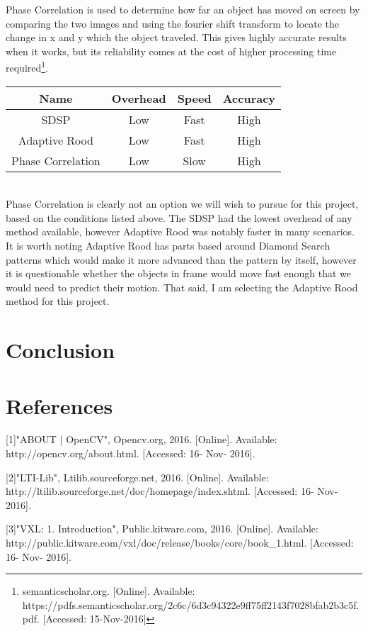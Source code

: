 \documentclass[letterpaper,10pt,onecolumn,draftclsnofoot]{IEEEtran}
\begin{document}
Phase Correlation is used to determine how far an object has moved on screen by comparing the two images and using the fourier shift transform to locate the change in x and y which the object traveled.  This gives highly accurate results when it works, but its reliability comes at the cost of higher processing time required\footnote{semanticscholar.org. [Online]. Available: https://pdfs.semanticscholar.org/2c6c/6d3c94322e9ff75ff2143f7028bfab2b3c5f.pdf. [Accessed: 15-Nov-2016] }. \\

\begin{tabular}{|c|c|c|c|}
  \hline
  \textbf{Name} & \textbf{Overhead} & \textbf{Speed} & \textbf{Accuracy} \\
  \hline
  SDSP & Low & Fast & High \\ 
  \hline
  Adaptive Rood & Low & Fast & High  \\ 
  \hline
  Phase Correlation & Low & Slow & High \\ 
  \hline
\end{tabular} \\

Phase Correlation is clearly not an option we will wish to pursue for this project, based on the conditions listed above.  The SDSP had the lowest overhead of any method available, however Adaptive Rood was notably faster in many scenarios.  It is worth noting Adaptive Rood has parts based around Diamond Search patterns which would make it more advanced than the pattern by itself, however it is questionable whether the objects in frame would move fast enough that we would need to predict their motion.  That said, I am selecting the Adaptive Rood method for this project.

\newpage
\section{Conclusion}

\section{References}

[1]"ABOUT | OpenCV", Opencv.org, 2016. [Online]. Available: http://opencv.org/about.html. [Accessed: 16- Nov- 2016].

[2]"LTI-Lib", Ltilib.sourceforge.net, 2016. [Online]. Available: http://ltilib.sourceforge.net/doc/homepage/index.shtml. [Accessed: 16- Nov- 2016].

[3]"VXL: 1. Introduction", Public.kitware.com, 2016. [Online]. Available: http://public.kitware.com/vxl/doc/release/books/core/book\_1.html. [Accessed: 16- Nov- 2016].
\end{document}
